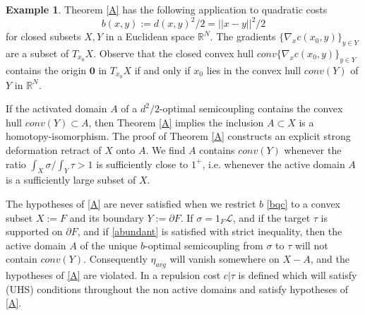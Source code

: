 \documentclass[12pt]{amsart}
\theoremstyle{definition}
\newtheorem{exx}{Example}
\theoremstyle{remark}
\newcommand{\bR}{\mathbb{R}}
\newcommand{\del}{\partial}
\begin{document}
\begin{exx}
Theorem \ref{A} has the following application to quadratic costs \begin{equation}\label{bqc} b(x,y):=d(x,y)^2/2=||x-y||^2/2\end{equation} for closed subsets $X,Y$ in a Euclidean space $\bR^N$. The gradients $\{\nabla_x c(x_0,y)\}_{y \in Y}$ are a subset of $T_{x_0} X$. Observe that the closed convex hull $conv\{\nabla_x c(x_0,y)\}_{y \in Y}$ contains the origin $\textbf{0}$ in $T_{x_0} X$ if and only if $x_0$ lies in the convex hull $conv(Y)$ of $Y$ in $\bR^N$. 

If the activated domain $A$ of a $d^2/2$-optimal semicoupling contains the convex hull $conv(Y) \subset A$, then Theorem \ref{A} implies the inclusion $A\subset X$ is a homotopy-isomorphism. The proof of Theorem \ref{A} constructs an explicit strong deformation retract of $X$ onto $A$.  We find $A$ contains $conv(Y)$ whenever the ratio $\int_X \sigma / \int_Y \tau>1$ is sufficiently close to $1^+$, i.e. whenever the active domain $A$ is a sufficiently large subset of $X$. 


The hypotheses of \ref{A} are never satisfied when we restrict $b$ \eqref{bqc} to a convex subset $X:=F$ and its boundary $Y:=\del F$. If $\sigma=1_F \mathscr{L}$, and if the target $\tau$ is supported on $\del F$, and if \eqref{abundant} is satisfied with strict inequality, then the active domain $A$ of the unique $b$-optimal semicoupling from $\sigma$ to $\tau$ will not contain $conv(Y)$. Consequently $\eta_{avg}$ will vanish somewhere on $X-A$, and the hypotheses of \ref{A} are violated. In \cite[Ch.4]{martel} a repulsion cost $c|\tau$ is defined which will satisfy (UHS) conditions throughout the non active domains and satisfy hypotheses of \ref{A}. 
\end{exx}
\end{document}
